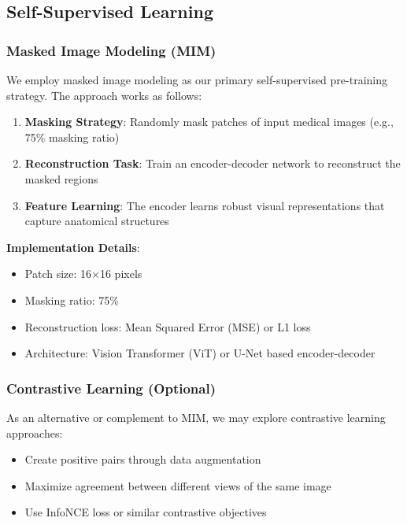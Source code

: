 \documentclass[conference]{IEEEtran}
\begin{document}
\subsection{Self-Supervised Learning}

\subsubsection{Masked Image Modeling (MIM)}

We employ masked image modeling as our primary self-supervised pre-training strategy. The approach works as follows:

\begin{enumerate}
    \item \textbf{Masking Strategy}: Randomly mask patches of input medical images (e.g., 75\% masking ratio)
    \item \textbf{Reconstruction Task}: Train an encoder-decoder network to reconstruct the masked regions
    \item \textbf{Feature Learning}: The encoder learns robust visual representations that capture anatomical structures
\end{enumerate}

\textbf{Implementation Details}:
\begin{itemize}
    \item Patch size: 16×16 pixels
    \item Masking ratio: 75\%
    \item Reconstruction loss: Mean Squared Error (MSE) or L1 loss
    \item Architecture: Vision Transformer (ViT) or U-Net based encoder-decoder
\end{itemize}

\subsubsection{Contrastive Learning (Optional)}

As an alternative or complement to MIM, we may explore contrastive learning approaches:
\begin{itemize}
    \item Create positive pairs through data augmentation
    \item Maximize agreement between different views of the same image
    \item Use InfoNCE loss or similar contrastive objectives
\end{itemize}
\end{document}
